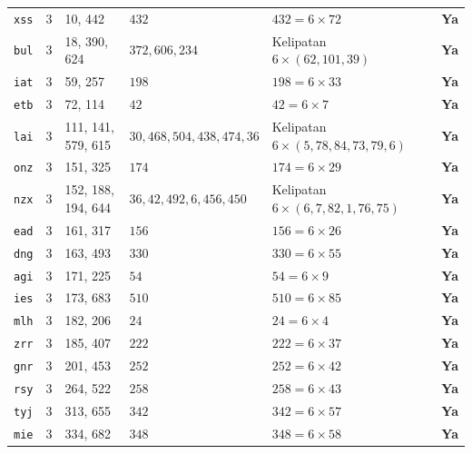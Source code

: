 \documentclass[11pt,a4paper]{article}
\begin{document}
\begin{table}[h!]
{\begin{tabular}{l c l l l c}
\texttt{xss}   & 3 & 10, 442       & $432$          & $432 = 6 \times 72$                              & \textbf{Ya} \\
\texttt{bul}   & 3 & 18, 390, 624  & $372, 606, 234$& Kelipatan $6 \times (62, 101, 39)$               & \textbf{Ya} \\
\texttt{iat}   & 3 & 59, 257       & $198$          & $198 = 6 \times 33$                              & \textbf{Ya} \\
\texttt{etb}   & 3 & 72, 114       & $42$           & $42 = 6 \times 7$                                & \textbf{Ya} \\
\texttt{lai}   & 3 & 111, 141, 579, 615 & $30, 468, 504, 438, 474, 36$ & Kelipatan $6 \times (5, 78, 84, 73, 79, 6)$ & \textbf{Ya} \\
\texttt{onz}   & 3 & 151, 325      & $174$          & $174 = 6 \times 29$                              & \textbf{Ya} \\
\texttt{nzx}   & 3 & 152, 188, 194, 644 & $36, 42, 492, 6, 456, 450$ & Kelipatan $6 \times (6, 7, 82, 1, 76, 75)$ & \textbf{Ya} \\
\texttt{ead}   & 3 & 161, 317      & $156$          & $156 = 6 \times 26$                              & \textbf{Ya} \\
\texttt{dng}   & 3 & 163, 493      & $330$          & $330 = 6 \times 55$                              & \textbf{Ya} \\
\texttt{agi}   & 3 & 171, 225      & $54$           & $54 = 6 \times 9$                                & \textbf{Ya} \\
\texttt{ies}   & 3 & 173, 683      & $510$          & $510 = 6 \times 85$                              & \textbf{Ya} \\
\texttt{mlh}   & 3 & 182, 206      & $24$           & $24 = 6 \times 4$                                & \textbf{Ya} \\
\texttt{zrr}   & 3 & 185, 407      & $222$          & $222 = 6 \times 37$                              & \textbf{Ya} \\
\texttt{gnr}   & 3 & 201, 453      & $252$          & $252 = 6 \times 42$                              & \textbf{Ya} \\
\texttt{rsy}   & 3 & 264, 522      & $258$          & $258 = 6 \times 43$                              & \textbf{Ya} \\
\texttt{tyj}   & 3 & 313, 655      & $342$          & $342 = 6 \times 57$                              & \textbf{Ya} \\
\texttt{mie}   & 3 & 334, 682      & $348$          & $348 = 6 \times 58$                              & \textbf{Ya} \\

\end{tabular}}
\end{table}
\end{document}
